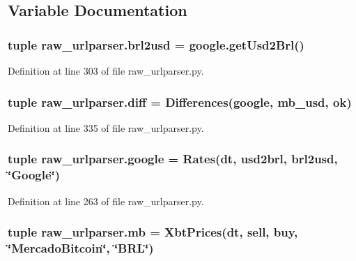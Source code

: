 \subsection{Variable Documentation}
\hypertarget{namespaceraw__urlparser_a382c2b22f2386b1e493674c7d72b9b95}{
\subsubsection[{brl2usd}]{\setlength{\rightskip}{0pt plus 5cm}tuple raw\-\_\-urlparser.\-brl2usd = google.\-get\-Usd2\-Brl()}}\label{namespaceraw__urlparser_a382c2b22f2386b1e493674c7d72b9b95}


Definition at line 303 of file raw\-\_\-urlparser.\-py.

\hypertarget{namespaceraw__urlparser_a2a48999f60075fd5b96e6d540cce34c9}{
\subsubsection[{diff}]{\setlength{\rightskip}{0pt plus 5cm}tuple raw\-\_\-urlparser.\-diff = {\bf Differences}({\bf google}, {\bf mb\-\_\-usd}, {\bf ok})}}\label{namespaceraw__urlparser_a2a48999f60075fd5b96e6d540cce34c9}


Definition at line 335 of file raw\-\_\-urlparser.\-py.

\hypertarget{namespaceraw__urlparser_a8d7c05a0ed7b2f3a3014caa73a2999d1}{
\subsubsection[{google}]{\setlength{\rightskip}{0pt plus 5cm}tuple raw\-\_\-urlparser.\-google = {\bf Rates}(dt, usd2brl, {\bf brl2usd}, \char`\"{}Google\char`\"{})}}\label{namespaceraw__urlparser_a8d7c05a0ed7b2f3a3014caa73a2999d1}


Definition at line 263 of file raw\-\_\-urlparser.\-py.

\hypertarget{namespaceraw__urlparser_a964275295a1dcba5dbdc3b113a75c4bb}{
\subsubsection[{mb}]{\setlength{\rightskip}{0pt plus 5cm}tuple raw\-\_\-urlparser.\-mb = {\bf Xbt\-Prices}(dt, sell, buy, \char`\"{}Mercado\-Bitcoin\char`\"{}, \char`\"{}B\-R\-L\char`\"{})}}\label{namespaceraw__urlparser_a964275295a1dcba5dbdc3b113a75c4bb}


